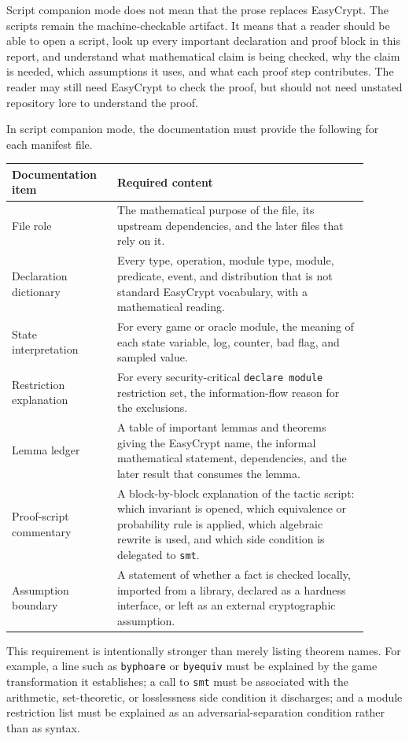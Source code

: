 \documentclass[11pt]{report}
\DeclareRobustCommand{\ec}[1]{\ifmmode\text{\nolinkurl{#1}}\else\nolinkurl{#1}\fi}
\theoremstyle{definition}
\theoremstyle{plain}
\begin{document}
Script companion mode does not mean that the prose replaces EasyCrypt.  The
scripts remain the machine-checkable artifact.  It means that a reader should be
able to open a script, look up every important declaration and proof block in
this report, and understand what mathematical claim is being checked, why the
claim is needed, which assumptions it uses, and what each proof step contributes.
The reader may still need EasyCrypt to check the proof, but should not need
unstated repository lore to understand the proof.

In script companion mode, the documentation must provide the following for each
manifest file.

\begin{longtable}{p{0.26\linewidth}p{0.64\linewidth}}
\toprule
\textbf{Documentation item} & \textbf{Required content} \\
\midrule
File role & The mathematical purpose of the file, its upstream dependencies, and
the later files that rely on it. \\
Declaration dictionary & Every type, operation, module type, module, predicate,
event, and distribution that is not standard EasyCrypt vocabulary, with a
mathematical reading. \\
State interpretation & For every game or oracle module, the meaning of each
state variable, log, counter, bad flag, and sampled value. \\
Restriction explanation & For every security-critical \ec{declare module}
restriction set, the information-flow reason for the exclusions. \\
Lemma ledger & A table of important lemmas and theorems giving the EasyCrypt
name, the informal mathematical statement, dependencies, and the later result
that consumes the lemma. \\
Proof-script commentary & A block-by-block explanation of the tactic script:
which invariant is opened, which equivalence or probability rule is applied,
which algebraic rewrite is used, and which side condition is delegated to
\ec{smt}. \\
Assumption boundary & A statement of whether a fact is checked locally,
imported from a library, declared as a hardness interface, or left as an
external cryptographic assumption. \\
\bottomrule
\end{longtable}

This requirement is intentionally stronger than merely listing theorem names.
For example, a line such as \ec{byphoare} or \ec{byequiv} must be explained by
the game transformation it establishes; a call to \ec{smt} must be associated
with the arithmetic, set-theoretic, or losslessness side condition it discharges;
and a module restriction list must be explained as an adversarial-separation
condition rather than as syntax.
\end{document}

